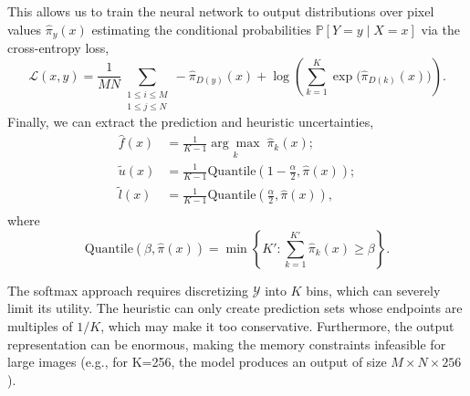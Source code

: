 \documentclass[10pt]{article}
\newcommand{\Y}{\mathcal{Y}}
\renewcommand{\P}{\mathbb{P}}
\begin{document}
This allows us to train the neural network to output distributions over pixel values $\hat{\pi}_y(x)$ estimating the conditional probabilities $\P\left[ Y=y \mid X=x \right]$ via the cross-entropy loss,
\begin{equation}
    \mathcal{L}(x,y) = \frac{1}{MN}\sum\limits_{\substack{1 \leq i \leq M \\ 1 \leq j \leq N}}-\hat{\pi}_{D(y)}(x) + \log \left( \sum\limits_{k=1}^K\exp\big(\hat{\pi}_{D(k)}(x)\big) \right).
\end{equation}
Finally, we can extract the prediction and heuristic uncertainties,
\begin{align}
    \hat{f}(x) &= \frac{1}{K-1} \underset{k}{\arg\max}\; \hat{\pi}_k(x) ; \\
    \tilde{u}(x) &= \frac{1}{K-1}  \mathrm{Quantile}\left(1-\frac{\alpha}{2}, \hat{\pi}(x) \right); \\
    \tilde{l}(x) &= \frac{1}{K-1}  \mathrm{Quantile}\left(\frac{\alpha}{2}, \hat{\pi}(x) \right), \\
\end{align}
where
\begin{equation}
    \mathrm{Quantile}\left(\beta, \hat{\pi}(x) \right) = \min\left\{ K' : \sum\limits_{k=1}^{K'}\hat{\pi}_{k}(x) \geq \beta \right\}.
\end{equation}

The softmax approach requires discretizing $\Y$ into $K$ bins, which can severely limit its utility.
The heuristic can only create prediction sets whose endpoints are multiples of $1/K$, which may make it too conservative.
Furthermore, the output representation can be enormous, making the memory constraints infeasible for large images (e.g., for K=256, the model produces an output of size $M\times N \times 256$).
\end{document}
